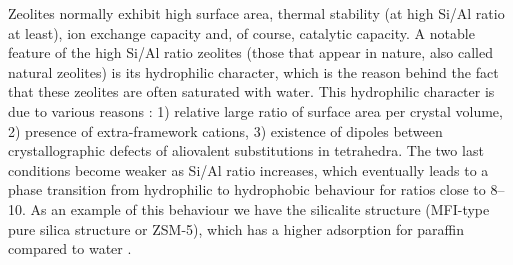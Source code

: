 Zeolites normally exhibit high surface area, thermal stability (at high Si/Al ratio at least), ion exchange capacity and, of course, catalytic capacity. 
A notable feature of the high Si/Al ratio zeolites (those that appear in nature, also called natural zeolites) is its hydrophilic character, which is the reason behind the fact that these zeolites are often saturated with water. This hydrophilic character is due to various reasons :
1) relative large ratio of surface area per crystal volume,
2) presence of extra-framework cations,
3) existence of dipoles between crystallographic defects of aliovalent substitutions in tetrahedra.
The two last conditions become weaker as Si/Al ratio increases, which eventually leads to a phase transition from hydrophilic to hydrophobic behaviour for ratios close to  8--10.
As an example of this behaviour we have the silicalite structure (MFI-type pure silica structure or ZSM-5), which has a higher adsorption for paraffin compared to water \cite{Olson1996}.

